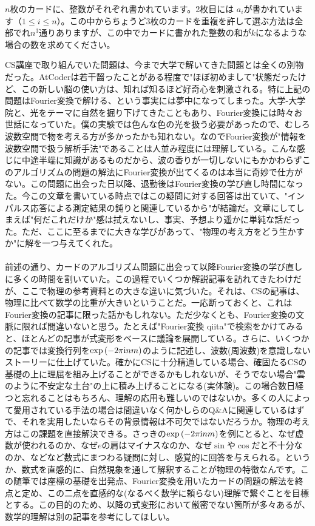 \documentclass{ltjsarticle}
\begin{document}
\begin{tcolorbox}
    $n$枚のカードに、整数がそれぞれ書かれています。2枚目には $a_i$が書かれています（$1\leq i \leq n$）。この中からちょうど3枚のカードを重複を許して選ぶ方法は全部でれ$n^3$通りありますが、この中でカードに書かれた整数の和が$k$になるような場合の数を求めてください。
\end{tcolorbox}
CS講座で取り組んでいた問題は、今まで大学で解いてきた問題とは全くの別物だった。AtCoderは若干齧ったことがある程度で"ほぼ初めまして"状態だったけど、この新しい脳の使い方は、知れば知るほど好奇心を刺激される。特に上記の問題はFourier変換で解ける、という事実には夢中になってしまった。大学-大学院と、光をテーマに自然を掘り下げてきたこともあり、Fourier変換には時々お世話になっていた。僕の実験では色んな色の光を扱う必要があったので、むしろ波数空間で物を考える方が多かったかも知れない。なのでFourier変換が"情報を波数空間で扱う解析手法"であることは人並み程度には理解している。こんな感じに中途半端に知識があるものだから、波の香りが一切しないにもかかわらずこのアルゴリズムの問題の解法にFourier変換が出てくるのは本当に奇妙で仕方がない。この問題に出会った日以降、退勤後はFourier変換の学び直し時間になった。今この文章を書いている時点ではこの疑問に対する回答は出ていて、"インパルス応答による測定結果の鈍りと関連しているから"が結論だ。文章にしてしまえば"何だこれだけか"感は拭えないし、事実、予想より遥かに単純な話だった。ただ、ここに至るまでに大きな学びがあって、"物理の考え方をどう生かすか"に解を一つ与えてくれた。
\\
\\
前述の通り、カードのアルゴリズム問題に出会って以降Fourier変換の学び直しに多くの時間を割いていた。この過程でいくつか解説記事を訪れてきたわけだが、ここで物理の参考資料との大きな違いに気づいた。それは、CSの記事は、物理に比べて数学の比重が大きいということだ。一応断っておくと、これはFourier変換の記事に限った話かもしれない。ただ少なくとも、Fourier変換の文脈に限れば間違いないと思う。たとえば"Fourier変換 qiita"で検索をかけてみると、ほとんどの記事が式変形をベースに議論を展開している。さらに、いくつかの記事では変換行列を$\exp{(-2\pi  \mathrm{i} nm)}$のように記述し、波数(周波数)を意識しないストーリーに仕上げていた。確かにCSに十分精通している場合、確固たるCSの基礎の上に理屈を組み上げることができるかもしれないが、そうでない場合"雲のように不安定な土台"の上に積み上げることになる(実体験)。この場合数日経つと忘れることはもちろん、理解の応用も難しいのではないか。多くの人によって愛用されている手法の場合は間違いなく何かしらのQ\&Aに関連しているはずで、それを実用したいならその背景情報は不可欠ではないだろうか。物理の考え方はこの課題を直接解決できる。さっきの$\exp{(-2\pi  \mathrm{i} nm)}$を例にとると、なぜ虚数が使われるのか、なぜ$e$の肩はマイナスなのか、なぜ$\sin$や$\cos$だと不十分なのか、などなど数式にまつわる疑問に対し、感覚的に回答を与えられる。というか、数式を直感的に、自然現象を通して解釈することが物理の特徴なんです。この随筆では座標の基礎を出発点、Fourier変換を用いたカードの問題の解法を終点と定め、この二点を直感的な(なるべく数学に頼らない)理解で繋ぐことを目標とする。この目的のため、以降の式変形において厳密でない箇所が多々あるが、数学的理解は別の記事を参考にしてほしい。
\end{document}
